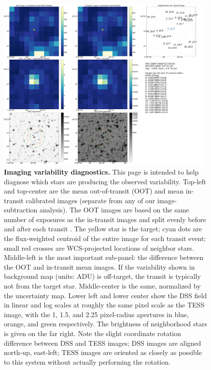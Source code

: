 \documentclass[12pt,twocolumn,tighten]{aastex62}
\begin{document}
\begin{figure}[!h]
	\begin{center}
		\leavevmode
		\includegraphics[width=0.98\textwidth]{gaiatwo0005599752663752776192-0007_page06.pdf}
	\end{center}
	\vspace{-0.5cm}
	\caption{
		{\bf Imaging variability diagnostics.} 
    This page is intended to help diagnose which stars are producing
    the observed variability.  Top-left and top-center are the mean
    out-of-transit (OOT) and mean in-transit calibrated images
    (separate from any of our image-subtraction analysis).  The OOT
    images are based on the same number of exposures as the in-transit
    images and split evenly before and after each transit
    \citep[following][]{bryson_identification_2013,kostov_l9859_2019}.
    The yellow star is the target; cyan dots are the flux-weighted
    centroid of the entire image for each transit event; small red
    crosses are WCS-projected locations of neighbor stars.
    Middle-left is the most important sub-panel: the difference
    between the OOT and in-transit mean images.  If the variability
    shown in background map (units: ADU) is off-target, the transit is
    typically not from the target star.  Middle-center is the same,
    normalized by the uncertainty map.  Lower left and lower center
    show the DSS field in linear and log scales at roughly the same
    pixel scale as the TESS image, with the 1, 1.5, and 2.25
    pixel-radius apertures in blue, orange, and green respectively.
    The brightness of neighborhood stars is given on the far right.
    Note the slight coordinate rotation difference between DSS and TESS images;
    DSS images are aligned north-up, east-left; TESS images are
    oriented as closely as possible to this system without actually
    performing the rotation.
		\label{fig:pg6}
	}
\end{figure}
\end{document}
